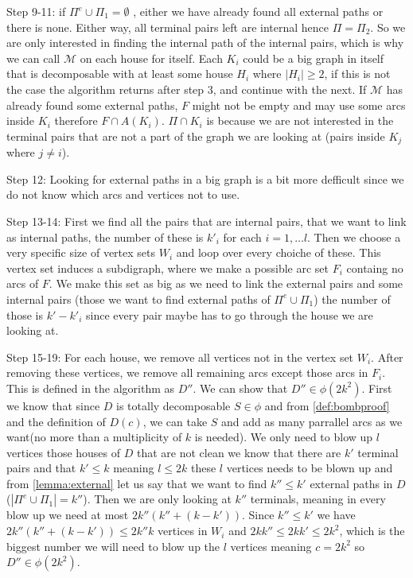     Step 9-11: if $\Pi^e\cup \Pi_1=\emptyset$ , either we have already found all external paths or there is none. 
    Either way, all terminal pairs left are internal hence $\Pi =\Pi_2$. 
    So we are only interested in finding the internal path of the internal pairs, which is why we can call $\mathcal{M}$ on each house for itself.
    Each $K_i$ could be a big graph in itself that is decomposable with at least some house $H_i$ where $|H_i|\geq 2$, if this is not the case the algorithm returns after step 3, and continue with the next. 
    If $\mathcal{M}$ has already found some external paths, $F$ might not be empty  and may use some arcs inside $K_i$ therefore $F\cap A(K_i)$. $\Pi \cap K_i$ is because we are not interested in the terminal pairs that are not a part of the graph we are looking at (pairs inside $K_j$ where $j\neq i$).

    Step 12: Looking for external paths in a big graph is a bit more defficult since we do not know which arcs and vertices not to use.
    
    Step 13-14: First we find all the pairs that are internal pairs, that we want to link as internal paths, the number of these is $k'_i$ for each $i=1,\dots l$. 
    Then we choose a very specific size of vertex sets $W_i$ and loop over every choiche of these.
    This vertex set induces a subdigraph, where we make a possible arc set $F_i$ containg no arcs of $F$.
    We make this set as big as we need to link the external pairs and some internal pairs (those we want to find external paths of $\Pi^e\cup \Pi_1$) the number of those is $k'-k'_i$ since every pair maybe has to go through the house we are looking at.
    
    Step 15-19: For each house, we remove all vertices not in the vertex set $W_i$. 
    After removing these vertices, we remove all remaining arcs except those arcs in $F_i$.
    This is defined in the algorithm as $D''$. We can show that $D''\in \phi(2k^2)$. 
    First we know that since $D$ is totally decomposable $S\in \phi$ and from \autoref{def:bombproof} and the definition of $D(c)$, we can take $S$ and add as many parrallel arcs as we want(no more than a multiplicity of $k$ is needed). 
    We only need to blow up $l$ vertices those houses of $D$ that are not clean we know that there are $k'$ terminal pairs and that $k'\leq k$ meaning $l\leq 2k$ these $l$ vertices needs to be blown up and from \autoref{lemma:external} let us say that we want to find $k''\leq k'$ external paths in $D$ ($|\Pi^e \cup \Pi_1|=k''$). 
    Then we are only looking at $k''$ terminals, meaning in every blow up we need at most $2k''(k''+(k-k'))$. 
    Since $k''\leq k'$ we have $2k''(k''+(k-k'))\leq 2k''k$ vertices in $W_i$ and $2kk''\leq 2kk'\leq 2k^2$, which is the biggest number we will need to blow up the $l$ vertices meaning $c=2k^2$ so $D''\in \phi (2k^2)$.


